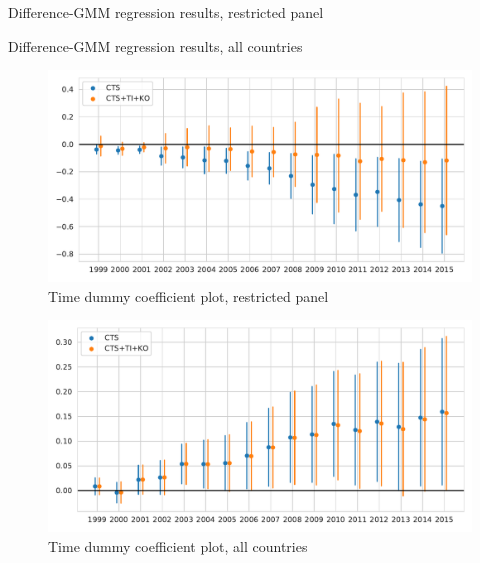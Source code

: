 \documentclass[12pt,a4paper]{article}
\begin{document}
\clearpage

\renewcommand{\arraystretch}{3}
\begin{table}[htbp]
\centering
\resizebox{\textwidth}{!}{%

}
\caption{Difference-GMM regression results, restricted panel}
\label{tab:diffgmm_coeff_subset}
\end{table}
\renewcommand{\arraystretch}{1}

\renewcommand{\arraystretch}{3}
\begin{table}[htbp]
\centering
\resizebox{\textwidth}{!}{%

}
\caption{Difference-GMM regression results, all countries}
\label{tab:diffgmm_coeff_all}
\end{table}
\renewcommand{\arraystretch}{1}

\begin{figure}[htbp]
\centering
\includegraphics[width=\textwidth]{./plots/dis/time_dummy_cts_subset.pdf}
\caption{Time dummy coefficient plot, restricted panel}
\label{fig:gmm_time_dummy_subset}
\end{figure}

\begin{figure}[htbp]
\centering
\includegraphics[width=\textwidth]{./plots/dis/time_dummy_cts_all.pdf}
\caption{Time dummy coefficient plot, all countries}
\label{fig:gmm_time_dummy_all}
\end{figure}
\end{document}
